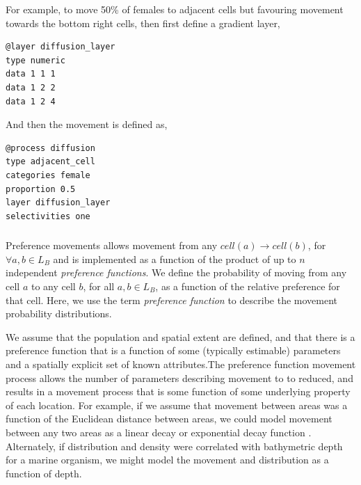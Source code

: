For example, to move 50\% of females to adjacent cells but favouring movement towards the bottom right cells, then first define a gradient layer, 

{\small{\begin{verbatim}
@layer diffusion_layer
type numeric
data 1 1 1
data 1 2 2
data 1 2 4
\end{verbatim}}}

And then the movement is defined as,

{\small{\begin{verbatim}
@process diffusion
type adjacent_cell
categories female
proportion 0.5
layer diffusion_layer
selectivities one
\end{verbatim}}}

\subsubsection{}

Preference movements allows movement from any $cell(a) \rightarrow cell(b)$, for $\forall a,b \in L_B$ and is implemented as a function of the product of up to $n$ independent \emph{preference functions}. We define the probability of moving from any cell $a$ to any cell $b$, for all $a,b \in L_B$, as a function of the relative preference for that cell. Here, we use the term \emph{preference function} \citep{1366,1367} to describe the movement probability distributions. 

We assume that the population and spatial extent are defined, and that there is a preference function that is a function of some (typically estimable) parameters and a spatially explicit set of known attributes.The preference function movement process allows the number of parameters describing movement to to reduced, and results in a movement process that is some function of some underlying property of each location. For example, if we assume that movement between areas was a function of the Euclidean distance between areas, we could model movement between any two areas as a linear decay or exponential decay function \citep{1366}. Alternately, if distribution and density were correlated with bathymetric depth for a marine organism, we might model the movement and distribution as a function of depth. 

